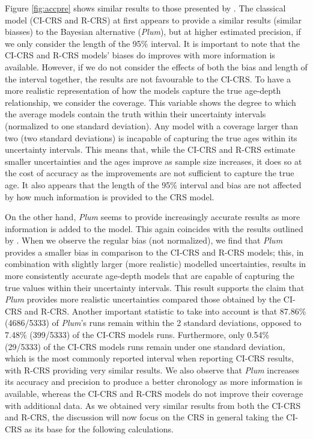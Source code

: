 \documentclass [10pt] {article}
\begin{document}
Figure \ref{fig:accpre} shows similar results to those presented by \citet{Blaauw2018}. 
The classical model (CI-CRS and R-CRS) at first appears to provide a similar results (similar biasses) to the Bayesian alternative (\textit{Plum}), but at higher estimated precision, if we only consider the length of the 95\% interval. 
It is important to note that the CI-CRS and R-CRS models' biases do improves with more information is available.
However, if we do not consider the effects of both the bias and length of the interval together, the results are not favourable to the CI-CRS. 
To have a more realistic representation of how the models capture the true age-depth relationship, we consider the coverage. 
This variable shows the degree to which the average models contain the truth within their uncertainty intervals (normalized to one standard deviation). 
Any model with a coverage larger than two (two standard deviations) is incapable of capturing the true ages within its uncertainty intervals.  
This means that, while the CI-CRS and R-CRS estimate smaller uncertainties and the ages improve as sample size increases, it does so at the cost of accuracy as the improvements are not sufficient to capture the true age.
It also appears that the length of the 95\% interval and bias are not affected by how much information is provided to the CRS model.

On the other hand, \textit{Plum} seems to provide increasingly accurate results as more information is added to the model.
This again coincides with the results outlined by \citet{Blaauw2018}. 
When we observe the regular bias (not normalized), we find that \textit{Plum} provides a smaller bias in comparison to the CI-CRS and R-CRS models; this, in combination with slightly larger (more realistic) modelled uncertainties, results in more consistently accurate age-depth models that are capable of capturing the true values within their uncertainty intervals. 
This result supports the claim that \textit{Plum} provides more realistic uncertainties compared those obtained by the CI-CRS and R-CRS. 
Another important statistic to take into account is that 87.86\% (4686/5333) of \textit{Plum}'s runs remain within the 2 standard deviations, opposed to 7.48\% (399/5333) of the CI-CRS models runs. 
Furthermore, only 0.54\% (29/5333) of the CI-CRS models runs remain under one standard deviation, which is the most commonly reported interval when reporting CI-CRS results, with R-CRS providing very similar results.
We also observe that \textit{Plum} increases its accuracy and precision to produce a better chronology as more information is available, whereas the CI-CRS and R-CRS models do not improve their coverage with additional data. 
As we obtained very similar results from both the CI-CRS and R-CRS, the discussion will now focus on the CRS in general taking the CI-CRS as its base for the following calculations.
\end{document}
